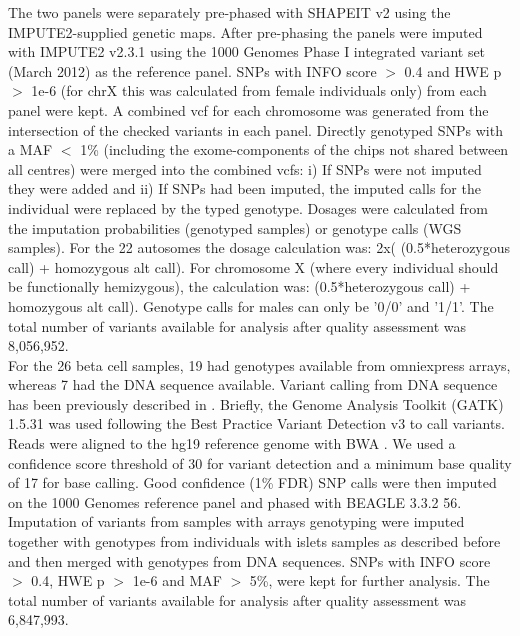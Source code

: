The two panels were separately pre-phased with SHAPEIT v2 \cite{delaneauIntegratingSequenceArray2014} using the IMPUTE2-supplied genetic maps. After pre-phasing the panels were imputed with IMPUTE2 v2.3.1 \cite{howieFlexibleAccurateGenotype2009} using the 1000 Genomes Phase I integrated variant set (March 2012) as the reference panel. SNPs with INFO score $>$ 0.4 and HWE p $>$ 1e-6 (for chrX this was calculated from female individuals only) from each panel were kept. A combined vcf for each chromosome was generated from the intersection of the checked variants in each panel. Directly genotyped SNPs with a MAF $<$ 1\% (including the exome-components of the chips not shared between all centres) were merged into the combined vcfs: i) If SNPs were not imputed they were added and ii) If SNPs had been imputed, the imputed calls for the individual were replaced by the typed genotype. Dosages were calculated from the imputation probabilities (genotyped samples) or genotype calls (WGS samples). For the 22 autosomes the dosage calculation was: 2x( (0.5*heterozygous call) + homozygous alt call). For chromosome X (where every individual should be functionally hemizygous), the calculation was: (0.5*heterozygous call) + homozygous alt call). Genotype calls for males can only be '0/0' and '1/1'. The total number of variants available for analysis after quality assessment was 8,056,952. \\

For the 26 beta cell samples, 19 had genotypes available from omniexpress arrays, whereas 7 had the DNA sequence available. Variant calling from DNA sequence has been previously described in \cite{nicaCelltypeAllelicGenetic2013}. Briefly, the Genome Analysis Toolkit (GATK) 1.5.31 \cite{mckennaGenomeAnalysisToolkit2010} was used following the Best Practice Variant Detection v3 to call variants. Reads were aligned to the hg19 reference genome with BWA \cite{liFastAccurateShort2009a}. We used a confidence score threshold of 30 for variant detection and a minimum base quality of 17 for base calling. Good confidence (1\% FDR) SNP calls were then imputed on the 1000 Genomes reference panel and phased with BEAGLE 3.3.2 56. Imputation of variants from samples with arrays genotyping were imputed together with genotypes from individuals with islets samples as described before and then merged with genotypes from DNA sequences. SNPs with INFO score $>$ 0.4, HWE p $>$ 1e-6 and MAF $>$ 5\%, were kept for further analysis. The total number of variants available for analysis after quality assessment was 6,847,993.

